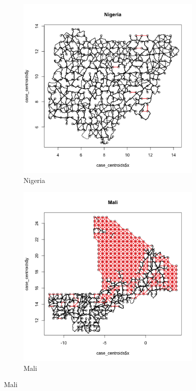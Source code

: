 \documentclass[11pt, oneside]{article}   	%
\begin{document}
\begin{figure}[p]
\centering
\caption{Road networks for different countries as scanned off OSM}

\begin{subfigure}[c]{0.43\textwidth}
\includegraphics[width=\textwidth, trim={1cm 1cm 0cm 2cm},clip]{../../Build/output/Road_Networks/network_Nigeria.png}
\caption{Nigeria}
\label{fig:nigeria_roads}
\end{subfigure}
\begin{subfigure}[c]{0.43\textwidth}
\includegraphics[width=\textwidth, trim={1cm 1cm 0cm 2cm},clip]{../../Build/output/Road_Networks/network_Mali.png}
\caption{Mali}
\label{fig:Mali_roads}
\end{subfigure}


\end{figure}
\end{document}
